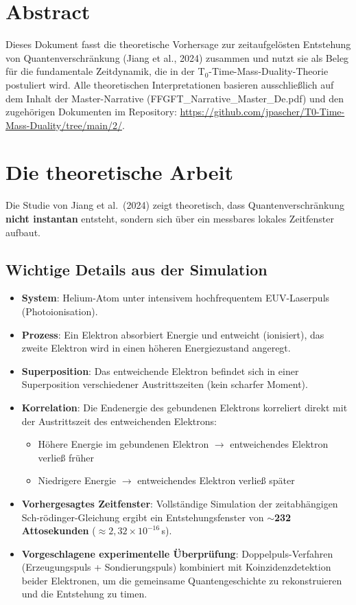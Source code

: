 \section*{Abstract}
		Dieses Dokument fasst die theoretische Vorhersage zur zeitaufgelösten Entstehung von Quantenverschränkung (Jiang et al., 2024) zusammen und nutzt sie als Beleg für die fundamentale Zeitdynamik, die in der T$_0$-Time-Mass-Duality-Theorie postuliert wird. Alle theoretischen Interpretationen basieren ausschließlich auf dem Inhalt der Master-Narrative (FFGFT\_Narrative\_Master\_De.pdf) und den zugehörigen Dokumenten im Repository:
		\url{https://github.com/jpascher/T0-Time-Mass-Duality/tree/main/2/}.

	
	\section{Die theoretische Arbeit}
	Die Studie von Jiang et al.\ (2024) zeigt theoretisch, dass Quantenverschränkung \textbf{nicht instantan} entsteht, sondern sich über ein messbares lokales Zeitfenster aufbaut.
	
	\subsection{Wichtige Details aus der Simulation}
	\begin{itemize}[leftmargin=*]
		\item \textbf{System}: Helium-Atom unter intensivem hochfrequentem EUV-Laserpuls (Photoionisation).
		\item \textbf{Prozess}: Ein Elektron absorbiert Energie und entweicht (ionisiert), das zweite Elektron wird in einen höheren Energiezustand angeregt.
		\item \textbf{Superposition}: Das entweichende Elektron befindet sich in einer Superposition verschiedener Austrittszeiten (kein scharfer Moment).
		\item \textbf{Korrelation}: Die Endenergie des gebundenen Elektrons korreliert direkt mit der Austrittszeit des entweichenden Elektrons:
		\begin{itemize}
			\item Höhere Energie im gebundenen Elektron $\to$ entweichendes Elektron verließ früher
			\item Niedrigere Energie $\to$ entweichendes Elektron verließ später
		\end{itemize}
		\item \textbf{Vorhergesagtes Zeitfenster}: Vollständige Simulation der zeitabhängigen Sch-rödinger-Gleichung ergibt ein Entstehungsfenster von $\sim$\textbf{232 Attosekunden} ($\approx 2{,}32 \times 10^{-16}$\,s).
		\item \textbf{Vorgeschlagene experimentelle Überprüfung}: Doppelpuls-Verfahren (Erzeugungspuls + Sondierungspuls) kombiniert mit Koinzidenzdetektion beider Elektronen, um die gemeinsame Quantengeschichte zu rekonstruieren und die Entstehung zu timen.
	\end{itemize}
	
